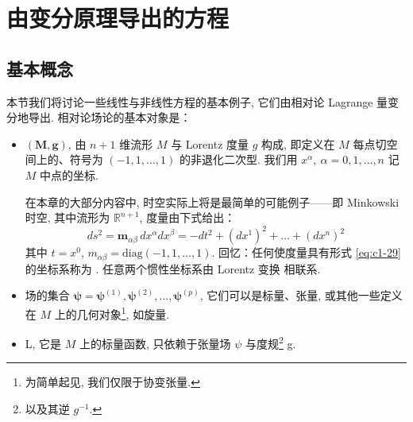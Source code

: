 
\chapter{由变分原理导出的方程}

\section{基本概念}

本节我们将讨论一些线性与非线性方程的基本例子, 它们由相对论 Lagrange 量变分地导出. 相对论场论的基本对象是：

\begin{itemize}
\item {} $(\mathbf{M}, \mathbf{g})$, 由 $n+1$ 维流形 $M$ 与 Lorentz 度量 $g$ 构成, 即定义在 $M$ 每点切空间上的、符号为 $(-1, 1, \ldots, 1)$ 的非退化二次型. 我们用 $x^\alpha, \ \alpha = 0, 1, \ldots, n$ 记 $M$ 中点的坐标. 

在本章的大部分内容中, 时空实际上将是最简单的可能例子——即 Minkowski 时空, 其中流形为 $\mathbb{R}^{n+1}$, 度量由下式给出：
\begin{equation}
ds^2 = \mathbf{m}_{\alpha\beta}\, dx^\alpha dx^\beta = -dt^2 + (dx^1)^2 + \dots + (dx^n)^2\label{eq:c1-29}
\end{equation}
其中 $t = x^0$, $m_{\alpha\beta} = \mathrm{diag}(-1, 1, \ldots, 1)$. 回忆：任何使度量具有形式 \eqref{eq:c1-29} 的坐标系称为 . 任意两个惯性坐标系由 Lorentz 变换 相联系. 

\item 场的集合 $\boldsymbol{\psi} = \boldsymbol{\psi}^{(1)}, \boldsymbol{\psi}^{(2)}, \dots, \boldsymbol{\psi}^{(p)}$, 它们可以是标量、张量, 或其他一些定义在 $M$ 上的几何对象\footnote{为简单起见, 我们仅限于协变张量. }, 如旋量. 

\item {} L, 它是 $M$ 上的标量函数, 只依赖于张量场 $\psi$ 与度规\footnote{以及其逆 $g^{-1}$. } g. 
\end{itemize}

